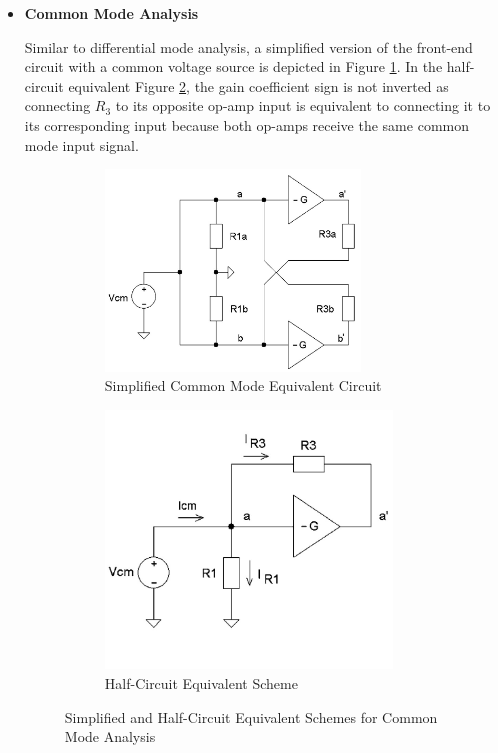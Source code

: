\begin{itemize}
\item \textbf{Common Mode Analysis}

Similar to differential mode analysis, a simplified version of the front-end circuit with a common voltage source is depicted in Figure \ref{fig:common_mode_simplified}. In the half-circuit equivalent Figure \ref{fig:common_mode_half_circuit}, the gain coefficient sign is not inverted as connecting \(R_3\) to its opposite op-amp input is equivalent to connecting it to its corresponding input because both op-amps receive the same common mode input signal.

\begin{figure}[h]
	\centering
	\begin{subfigure}{0.5\textwidth}
		\centering
	\includegraphics[width=0.8\textwidth]{images/common mode simplified}
		\caption{Simplified Common Mode Equivalent Circuit}
		\label{fig:common_mode_simplified}
	\end{subfigure}
	\hfill
	\begin{subfigure}{0.4\textwidth}
		\centering
		\includegraphics[width=0.9\textwidth]{images/common mode half}
		\caption{Half-Circuit Equivalent Scheme}
		\label{fig:common_mode_half_circuit}
	\end{subfigure}
	\caption{Simplified and Half-Circuit Equivalent Schemes for Common Mode Analysis}
	\label{fig:common_mode_analysis}
\end{figure}


\end{itemize}

